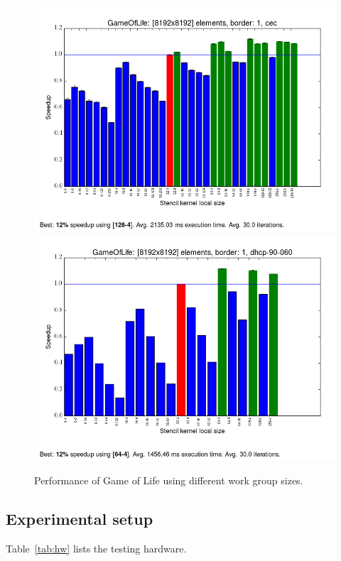 \begin{figure}[h]
\includegraphics[width=\textwidth]{../../benchmarks/results/e4/GameOfLife-00008192-01-cec.png}
\includegraphics[width=\textwidth]{../../benchmarks/results/e4/GameOfLife-00008192-01-dhcp-90-060.png}
\caption{Performance of Game of Life using different work group
  sizes.}
\label{fig:gol}
\end{figure}

\subsection{Experimental setup}

Table~\ref{tab:hw} lists the testing hardware.

